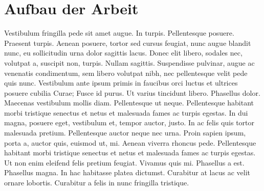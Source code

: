 \section{Aufbau der Arbeit}

Vestibulum fringilla pede sit amet augue. In turpis. Pellentesque posuere. Praesent turpis. Aenean posuere, tortor sed cursus feugiat, nunc augue blandit nunc, eu sollicitudin urna dolor sagittis lacus. Donec elit libero, sodales nec, volutpat a, suscipit non, turpis. Nullam sagittis. Suspendisse pulvinar, augue ac venenatis condimentum, sem libero volutpat nibh, nec pellentesque velit pede quis nunc. Vestibulum ante ipsum primis in faucibus orci luctus et ultrices posuere cubilia Curae; Fusce id purus. Ut varius tincidunt libero. Phasellus dolor. Maecenas vestibulum mollis diam. Pellentesque ut neque. Pellentesque habitant morbi tristique senectus et netus et malesuada fames ac turpis egestas. In dui magna, posuere eget, vestibulum et, tempor auctor, justo. In ac felis quis tortor malesuada pretium. Pellentesque auctor neque nec urna. Proin sapien ipsum, porta a, auctor quis, euismod ut, mi. Aenean viverra rhoncus pede. Pellentesque habitant morbi tristique senectus et netus et malesuada fames ac turpis egestas. Ut non enim eleifend felis pretium feugiat. Vivamus quis mi. Phasellus a est. Phasellus magna. In hac habitasse platea dictumst. Curabitur at lacus ac velit ornare lobortis. Curabitur a felis in nunc fringilla tristique. 

